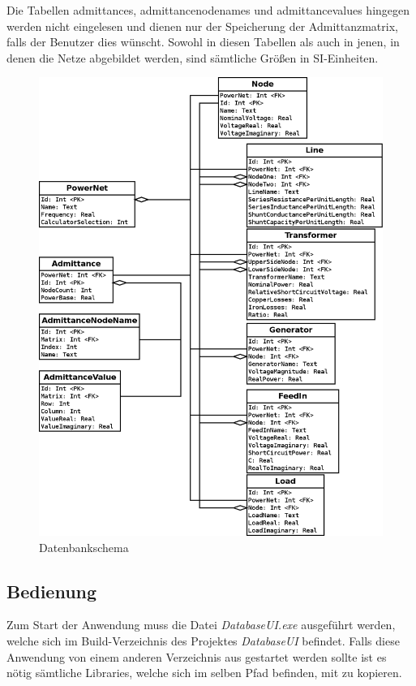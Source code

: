 \documentclass[12pt,a4paper]{article}
\begin{document}
	Die Tabellen admittances, admittancenodenames und admittancevalues hingegen werden nicht eingelesen und dienen nur der Speicherung der Admittanzmatrix, falls der Benutzer dies wünscht. Sowohl in diesen Tabellen als auch in jenen, in denen die Netze abgebildet werden, sind sämtliche Größen in SI-Einheiten.
	
	\begin{figure}
		\centering
		\includegraphics[scale=0.35]{Pictures/database_schema}
		\caption{Datenbankschema}
		\label{fig:database_schema}
	\end{figure}
	
	\subsection{Bedienung}
	Zum Start der Anwendung muss die Datei \emph{DatabaseUI.exe} ausgeführt werden, welche sich im Build-Verzeichnis des Projektes \emph{DatabaseUI} befindet. Falls diese Anwendung von einem anderen Verzeichnis aus gestartet werden sollte ist es nötig sämtliche Libraries, welche sich im selben Pfad befinden, mit zu kopieren.
	
\end{document}
